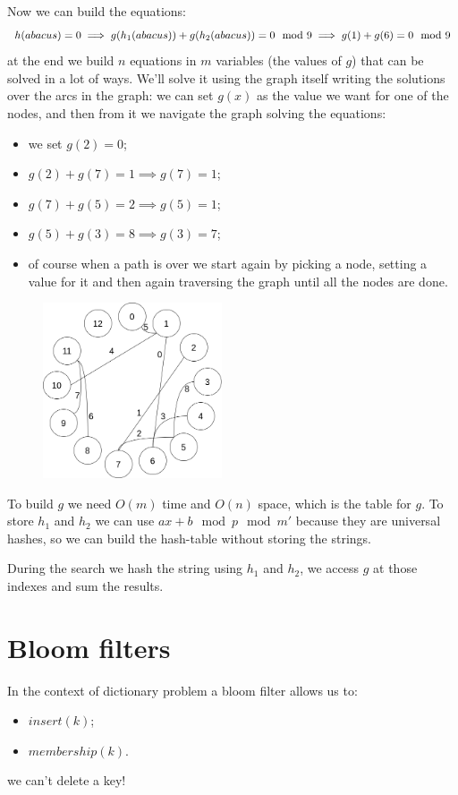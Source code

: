 Now we can build the equations:
$$
    h(abacus)= 0 \implies g(h_1(abacus)) + g(h_2(abacus)) = 0 \mod 9 \\
    \implies g(1) + g(6) = 0 \mod 9
$$
at the end we build $n$ equations in $m$ variables (the values of $g$) that can be solved in a lot of ways.
We'll solve it using the graph itself writing the solutions over the arcs in the graph: we can set $g(x)$ as the value we want for one of the nodes, and then from it we navigate the graph solving the equations:
\begin{itemize}
    \item we set $g(2) = 0$;
    \item $g(2) + g(7) = 1 \implies g(7) = 1$;
    \item $g(7) + g(5) = 2 \implies g(5) = 1$;
    \item $g(5) + g(3) = 8 \implies g(3) = 7$;
    \item of course when a path is over we start again by picking a node, setting a value for it and then again traversing the graph until all the nodes are done.
\end{itemize}
\begin{figure}[H]
    \centering
    \includegraphics[width=200px]{images/7_Hashing/mophf_graph_solved.png}
\end{figure}

To build $g$ we need $O(m)$ time and $O(n)$ space, which is the table for $g$.
To store $h_1$ and $h_2$ we can use $ax + b \mod p \mod m'$ because they are universal hashes, so we can build the hash-table without storing the strings.

During the search we hash the string using $h_1$ and $h_2$, we access $g$ at those indexes and sum the results.

\section{Bloom filters}
In the context of dictionary problem a bloom filter allows us to:
\begin{itemize}
    \item $insert(k)$;
    \item $membership(k)$.
\end{itemize}
we can't delete a key!

